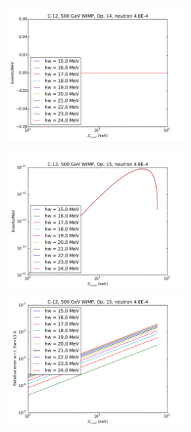 \documentclass{article}
\begin{document}
\includegraphics[width=0.5\textwidth]{c12-hw-o14}

\includegraphics[width=0.5\textwidth]{c12-hw-o15}
\includegraphics[width=0.5\textwidth]{c12-hw-o15-relerr}
\end{document}
